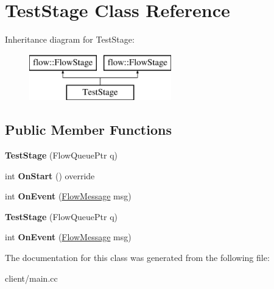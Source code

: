 \hypertarget{class_test_stage}{}\section{Test\+Stage Class Reference}
\label{class_test_stage}
Inheritance diagram for Test\+Stage\+:\begin{figure}[H]
\begin{center}
\leavevmode
\includegraphics[height=2.000000cm]{class_test_stage}
\end{center}
\end{figure}
\subsection*{Public Member Functions}
\begin{DoxyCompactItemize}
\item 
{\bfseries Test\+Stage} (Flow\+Queue\+Ptr q)\hypertarget{class_test_stage_a25d8917e1aee8177f4bfe5eb8c2ec43c}{}\label{class_test_stage_a25d8917e1aee8177f4bfe5eb8c2ec43c}

\item 
int {\bfseries On\+Start} () override\hypertarget{class_test_stage_a3aebabb3a16276d64de72695c52ba67c}{}\label{class_test_stage_a3aebabb3a16276d64de72695c52ba67c}

\item 
int {\bfseries On\+Event} (\hyperlink{classflow_1_1_flow_message}{Flow\+Message} msg)\hypertarget{class_test_stage_a4b80d1209869ca034d78285d31ff4466}{}\label{class_test_stage_a4b80d1209869ca034d78285d31ff4466}

\item 
{\bfseries Test\+Stage} (Flow\+Queue\+Ptr q)\hypertarget{class_test_stage_a25d8917e1aee8177f4bfe5eb8c2ec43c}{}\label{class_test_stage_a25d8917e1aee8177f4bfe5eb8c2ec43c}

\item 
int {\bfseries On\+Event} (\hyperlink{classflow_1_1_flow_message}{Flow\+Message} msg)\hypertarget{class_test_stage_a4b80d1209869ca034d78285d31ff4466}{}\label{class_test_stage_a4b80d1209869ca034d78285d31ff4466}

\end{DoxyCompactItemize}


The documentation for this class was generated from the following file\+:\begin{DoxyCompactItemize}
\item 
client/main.\+cc\end{DoxyCompactItemize}
